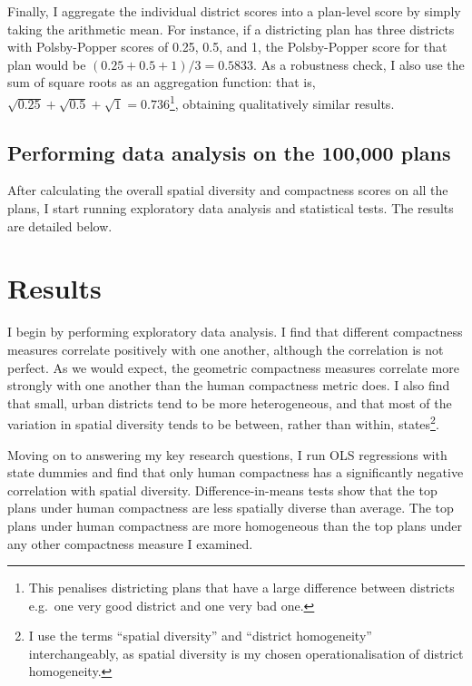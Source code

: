 \documentclass[]{article}
\begin{document}
Finally, I aggregate the individual district scores into a plan-level
score by simply taking the arithmetic mean. For instance, if a
districting plan has three districts with Polsby-Popper scores of 0.25,
0.5, and 1, the Polsby-Popper score for that plan would be
\((0.25 + 0.5 + 1) / 3 = 0.5833\). As a robustness check, I also use the
sum of square roots as an aggregation function: that is,
\(\sqrt{0.25} + \sqrt{0.5} + \sqrt{1} = 0.736\)\footnote{This penalises
  districting plans that have a large difference between districts
  e.g.~one very good district and one very bad one.}, obtaining
qualitatively similar results.

\hypertarget{performing-data-analysis-on-the-100000-plans}{%
\subsection{Performing data analysis on the 100,000
plans}\label{performing-data-analysis-on-the-100000-plans}}

After calculating the overall spatial diversity and compactness scores
on all the plans, I start running exploratory data analysis and
statistical tests. The results are detailed below.

\hypertarget{results}{%
\section{Results}\label{results}}

I begin by performing exploratory data analysis. I find that different
compactness measures correlate positively with one another, although the
correlation is not perfect. As we would expect, the geometric
compactness measures correlate more strongly with one another than the
human compactness metric does. I also find that small, urban districts
tend to be more heterogeneous, and that most of the variation in spatial
diversity tends to be between, rather than within, states\footnote{I use
  the terms ``spatial diversity'' and ``district homogeneity''
  interchangeably, as spatial diversity is my chosen operationalisation
  of district homogeneity.}.

Moving on to answering my key research questions, I run OLS regressions
with state dummies and find that only human compactness has a
significantly negative correlation with spatial diversity.
Difference-in-means tests show that the top plans under human
compactness are less spatially diverse than average. The top plans under
human compactness are more homogeneous than the top plans under any
other compactness measure I examined.
\end{document}
